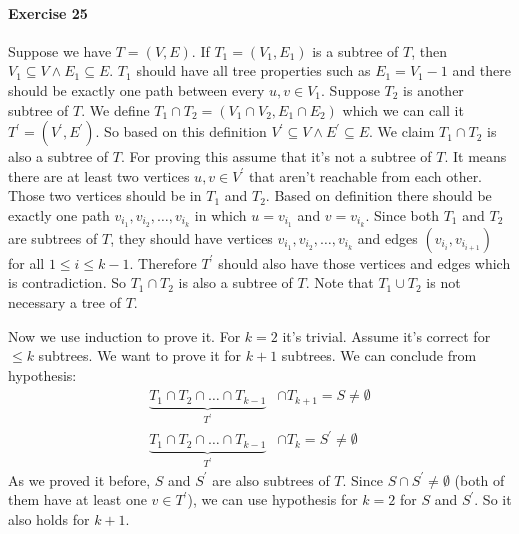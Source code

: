 \documentclass{book}
\begin{document}
	\paragraph{Exercise 25}
	Suppose we have $T = (V, E)$. If $T_1 = (V_1, E_1)$ is a subtree of $T$, then $V_1 \subseteq V \land E_1 \subseteq E$. $T_1$ should have all tree properties such as $E_1 = V_1 - 1$ and there should be exactly one path between every $u, v \in V_1$. Suppose $T_2$ is another subtree of $T$. We define $T_1 \cap T_2 = (V_1\cap V_2, E_1 \cap E_2)$ which we can call it $T^\prime = (V^\prime, E^\prime)$. So based on this definition $V^\prime \subseteq V \land E^\prime \subseteq E$. We claim $T_1 \cap T_2$ is also a subtree of $T$. For proving this assume that it's not a subtree of $T$. It means there are at least two vertices $u, v \in V^\prime$ that aren't reachable from each other. Those two vertices should be in $T_1$ and $T_2$. Based on definition there should be exactly one path $v_{i_1}, v_{i_2}, \dots, v_{i_k}$ in which $u = v_{i_1}$ and $v = v_{i_k}$. Since both $T_1$ and $T_2$ are subtrees of $T$, they should have vertices $v_{i_1}, v_{i_2}, \dots, v_{i_k}$ and edges $(v_{i_i}, v_{i_{i + 1}})$ for all $1 \le i \le k - 1$. Therefore $T^\prime$ should also have those vertices and edges which is contradiction. So $T_1 \cap T_2$ is also a subtree of $T$. Note that $T_1 \cup T_2$ is not necessary a tree of $T$.
	\par Now we use induction to prove it. For $k = 2$ it's trivial. Assume it's correct for $\le k$ subtrees. We want to prove it for $k + 1$ subtrees. We can conclude from hypothesis:
	\begin{equation*}
		\begin{split}
			\underbrace{T_1 \cap T_2 \cap \dots \cap T_{k - 1}}_{T^\prime} &\cap T_{k + 1} = S \ne \emptyset \\
			\underbrace{T_1 \cap T_2 \cap \dots \cap T_{k - 1}}_{T^\prime} &\cap T_k = S^\prime \ne \emptyset
		\end{split}
	\end{equation*}
	As we proved it before, $S$ and $S^\prime$ are also subtrees of $T$. Since $S \cap S^\prime \ne \emptyset$ (both of them have at least one $v \in T^\prime$), we can use hypothesis for $k =2$ for $S$ and $S^\prime$. So it also holds for $k + 1$.
	
\end{document}
